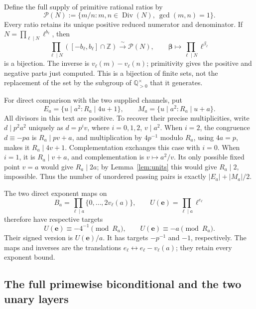 \documentclass[11pt]{article}
\theoremstyle{definition}\newtheorem{definition}[theorem]{Definition}
\theoremstyle{remark}\newtheorem{remark}[theorem]{Remark}
\DeclareMathOperator{\Div}{Div}
\newcommand{\Z}{\mathbb Z}\newcommand{\Q}{\mathbb Q}
\begin{document}
Define the full supply of primitive rational ratios by
\[
 \mathcal P(N):=\{m/n:m,n\in\Div(N),\ \gcd(m,n)=1\}.
\]
Every ratio retains its unique positive reduced numerator and
denominator.  If \(N=\prod_{\ell\mid N}\ell^{b_\ell}\), then
\begin{equation}\label{eq:signed-box}
 \prod_{\ell\mid N}([-b_\ell,b_\ell]\cap\Z)
 \xrightarrow{\;\sim\;}\mathcal P(N),\qquad
 \boldsymbol\beta\longmapsto\prod_{\ell\mid N}\ell^{\beta_\ell}
\end{equation}
is a bijection.  The inverse is \(v_\ell(m)-v_\ell(n)\);
primitivity gives the positive and negative parts just computed.
This is a bijection of finite sets, not the replacement of the set
by the subgroup of \(\Q_{>0}^{\times}\) that it generates.

For direct comparison with the two supplied channels, put
\[
 E_a=\{u\mid a^2:R_a\mid4u+1\},\qquad
 M_a=\{u\mid a^2:R_a\mid u+a\}.
\]
All divisors in this text are positive.  To recover their precise
multiplicities, write \(d\mid p^2a^2\) uniquely as \(d=p^i v\),
where \(i=0,1,2\), \(v\mid a^2\).  When \(i=2\), the congruence
\(d\equiv-pa\) is \(R_a\mid pv+a\), and multiplication by
\(4p^{-1}\) modulo \(R_a\), using \(4a=p\), makes it
\(R_a\mid4v+1\).  Complementation exchanges this case with \(i=0\).
When \(i=1\), it is \(R_a\mid v+a\), and complementation is
\(v\mapsto a^2/v\).  Its only possible fixed point \(v=a\) would
give \(R_a\mid2a\); by Lemma~\ref{lem:units} this would give
\(R_a\mid2\), impossible.  Thus the number of unordered passing
pairs is exactly \(|E_a|+|M_a|/2\).

The two direct exponent maps on
\[
 B_a=\prod_{\ell\mid a}\{0,\ldots,2v_\ell(a)\},\qquad
 U(\boldsymbol e)=\prod_{\ell\mid a}\ell^{e_\ell}
\]
therefore have respective targets
\[
 U(\boldsymbol e)\equiv -4^{-1}\pmod{R_a},
 \qquad U(\boldsymbol e)\equiv-a\pmod{R_a}.
\]
Their signed version is \(U(\boldsymbol e)/a\).  It has targets
\(-p^{-1}\) and \(-1\), respectively.  The maps and inverses are
the translations \(e_\ell\leftrightarrow e_\ell-v_\ell(a)\);
they retain every exponent bound.

\subsection{The full primewise biconditional and the two unary layers}
\end{document}

